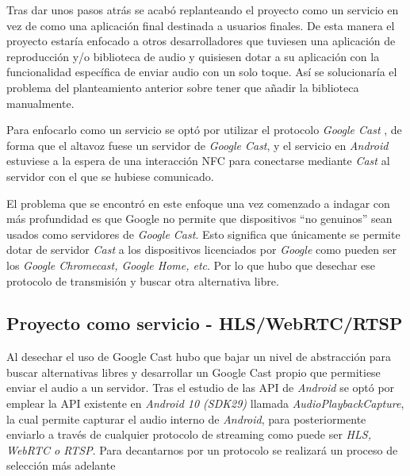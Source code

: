 Tras dar unos pasos atrás se acabó replanteando el proyecto como un servicio en
vez de como una aplicación final destinada a usuarios finales. De esta manera el
proyecto estaría enfocado a otros desarrolladores que tuviesen una aplicación de
reproducción y/o biblioteca de audio y quisiesen dotar a su aplicación con la
funcionalidad específica de enviar audio con un solo toque. Así se
solucionaría el problema del planteamiento anterior sobre tener que añadir la
biblioteca manualmente.

Para enfocarlo como un servicio se optó por utilizar el protocolo \emph{Google
Cast} \cite{google-cast}, de forma que el altavoz fuese
un servidor de \emph{Google Cast}, y el servicio en \emph{Android} estuviese a
la espera de una interacción NFC para conectarse mediante \emph{Cast} al
servidor con el que se hubiese comunicado.

El problema que se encontró en este enfoque una vez comenzado a indagar con más
profundidad es que Google no permite que dispositivos ``no genuinos'' sean
usados como servidores de \emph{Google Cast}. Esto significa que únicamente se
permite dotar de servidor \emph{Cast} a los dispositivos licenciados por
\emph{Google} como pueden ser los \emph{Google Chromecast, Google Home, etc}.
Por lo que hubo que desechar ese protocolo de transmisión y buscar otra
alternativa libre.

\subsection{Proyecto como servicio - HLS/WebRTC/RTSP}

Al desechar el uso de Google Cast hubo que bajar un nivel de abstracción para
buscar alternativas libres y desarrollar un Google Cast propio que permitiese
enviar el audio a un servidor. Tras el estudio de las API de \emph{Android} se
optó por emplear la API existente en \emph{Android 10 (SDK29)} llamada
\emph{AudioPlaybackCapture}, la cual permite capturar el audio interno de
\emph{Android}, para posteriormente enviarlo a través de cualquier protocolo de
streaming como puede ser \emph{HLS, WebRTC o RTSP}. Para decantarnos por un
protocolo se realizará un proceso de selección más adelante